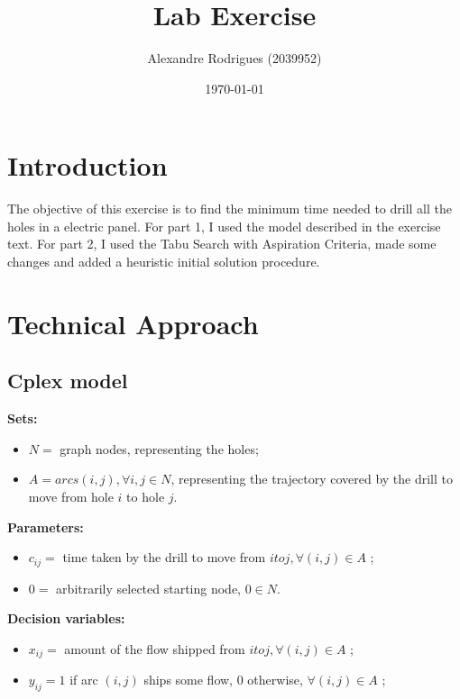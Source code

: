 \documentclass[a4paper, 11pt]{article}
\begin{document}
	
	\title{Lab Exercise}
	\author{{\small Alexandre Rodrigues (2039952)}}
	\date{\today}
	\maketitle
	
	\section{Introduction}
		The objective of this exercise is to find the minimum time needed to drill all the holes in a electric panel.
		For part 1, I used the model described in the exercise text.
		For part 2, I used the Tabu Search with Aspiration Criteria, made some changes and added a heuristic initial solution procedure.
		
		
	\section{Technical Approach}
	
		\subsection{Cplex model}
			\textbf{Sets:}
			\begin{itemize}
				\item $ N = $ graph nodes, representing the holes;
				\item $ A = arcs (i,j), \forall i,j \in N $, representing the trajectory covered by the drill to move from hole $ i $ to hole $ j $.
			\end{itemize}
		
			\textbf{Parameters:}
			\begin{itemize}
				\item $ c_{ij} = $ time taken  by the drill to move from $ i to j,\forall (i,j) \in A $ ;
				\item $ 0 = $ arbitrarily selected starting node, $ 0 \in N $.
			\end{itemize}
		
			\textbf{Decision variables:}
			\begin{itemize}
				\item $ x_{ij} = $ amount of the flow shipped from $ i to j,\forall (i,j) \in A $ ;
				\item $ y_{ij} = 1 $ if arc $ (i,j) $ ships some flow, $ 0 $ otherwise, $\forall (i,j) \in A $ ;
			\end{itemize}
		
		
				
\end{document}
